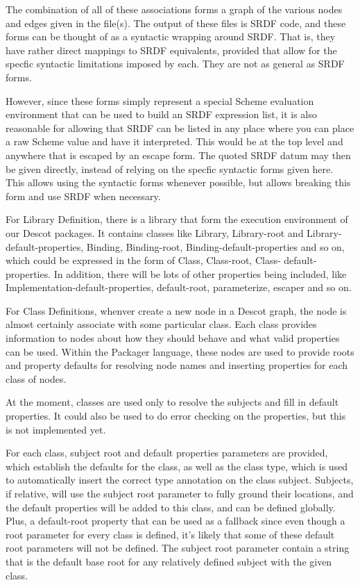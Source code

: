\noindent
The combination of all of these associations forms a graph of the 
various nodes and edges given in the file(s). The output of these 
files is SRDF code, and these forms can be thought of as a syntactic 
wrapping around SRDF. That is, they have rather direct mappings to 
SRDF equivalents, provided that allow for the specfic syntactic 
limitations imposed by each. They are not as general as SRDF forms.

However, since these forms simply represent a special Scheme evaluation 
environment that can be used to build an SRDF expression list, it is also 
reasonable for allowing that SRDF can be listed in any place where you 
can place a raw Scheme value and have it interpreted. This would be at the 
top level and anywhere that is escaped by an escape form. The quoted SRDF datum
may then be given directly, instead of relying on the specfic syntactic forms 
given here. This allows using the syntactic forms whenever possible, but
allows breaking this form and use SRDF when necessary.

For Library Definition, there is a library that form the execution environment
of our Descot packages. It contains classes like Library, Library-root and 
Library-default-properties, Binding, Binding-root, Binding-default-properties 
and so on, which could be expressed in the form of Class, Class-root, Class-
default-properties. In addition, there will be lots of other properties being 
included, like Implementation-default-properties, default-root, parameterize,
escaper and so on.

For Class Definitions, whenver create a new node in a Descot graph, the node is 
almost certainly associate with some particular class. Each class 
provides information to nodes about how they should behave and what valid 
properties can be used. Within the Packager language, these nodes are used 
to provide roots and property defaults for resolving node names and 
inserting properties for each class of nodes.

At the moment, classes are used only to resolve the subjects and fill 
in default properties. It could also be used to do error checking on 
the properties, but this is not implemented yet.

For each class, subject root and default properties parameters are provided, 
which establish the defaults for the class, as well as the class type, which 
is used to automatically insert the correct type annotation on the class 
subject. Subjects, if relative, will use the subject root parameter to fully 
ground their locations, and the default properties will be added to this class, 
and can be defined globally. Plus, a default-root property that can be used as 
a fallback since even though a root parameter for every class is defined, it's 
likely that some of these default root parameters will not be defined. The 
subject root parameter contain a string that is the default base root for any 
relatively defined subject with the given class.

